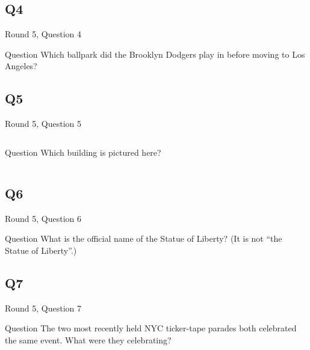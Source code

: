 \documentclass[11pt]{beamer}
\begin{document}
\subsection*{Q4}
\begin{frame}[t]{Round 5, Question 4}
\begin{block}{Question}
Which ballpark did the Brooklyn Dodgers play in before moving to Los Angeles?
\end{block}
\end{frame}
\subsection*{Q5}
\begin{frame}[t]{Round 5, Question 5}
\begin{columns}[T,totalwidth=\linewidth]
\begin{column}{0.32\linewidth}
\begin{block}{Question}
Which building is pictured here?
\end{block}
\end{column}
\begin{column}{0.65\linewidth}
\begin{center}
\texttt{[image: \{Images/singerbuilding]}.jpg}
\end{center}
\end{column}
\end{columns}
\end{frame}
\subsection*{Q6}
\begin{frame}[t]{Round 5, Question 6}
\begin{block}{Question}
What is the official name of the Statue of Liberty? (It is not ``the Statue of Liberty''.)
\end{block}
\end{frame}
\subsection*{Q7}
\begin{frame}[t]{Round 5, Question 7}
\begin{block}{Question}
The two most recently held NYC ticker-tape parades both celebrated the same event. What were they celebrating?
\end{block}
\end{frame}
\end{document}
